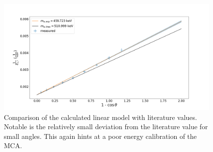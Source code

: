 \begin{figure}
	\centering
	\includegraphics[width=1.0\textwidth]{./fig/energy-shift.png}
	\caption{Comparison of the calculated linear model with literature values.
	Notable is the relatively small deviation from the literature value for small
	angles. This again hints at a poor energy calibration of the MCA.}
	\label{fig:energy-shift}
\end{figure}
